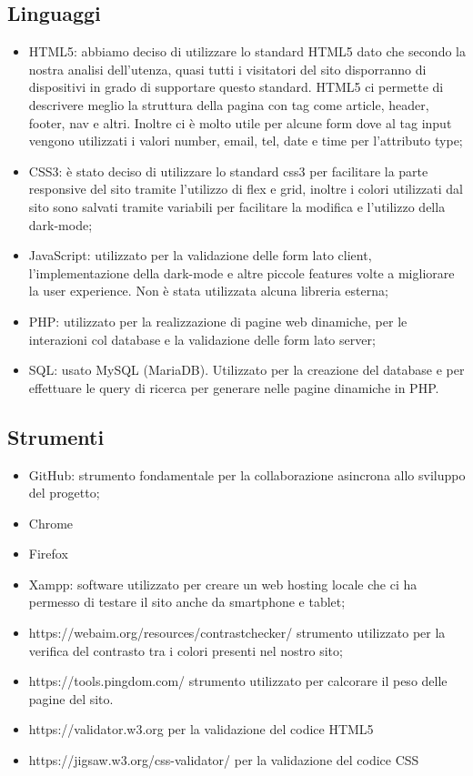 \documentclass[a4paper]{article}
\begin{document}
	\subsection{Linguaggi}
	\begin{itemize}
		\item HTML5: abbiamo deciso di utilizzare lo standard HTML5 dato che secondo la nostra analisi dell'utenza, quasi tutti i visitatori del sito disporranno di dispositivi in grado di supportare questo standard. HTML5 ci permette di descrivere meglio la struttura della pagina con tag come article, header, footer, nav e altri. Inoltre ci è molto utile per alcune form dove al tag input vengono utilizzati i valori number, email, tel, date e time per l'attributo type;
		\item CSS3: è stato deciso di utilizzare lo standard css3 per facilitare la parte responsive del sito tramite l'utilizzo di flex e grid, inoltre i colori utilizzati dal sito sono salvati tramite variabili per facilitare la modifica e l'utilizzo della dark-mode;
		\item JavaScript: utilizzato per la validazione delle form lato client, l'implementazione della dark-mode e altre piccole features volte a migliorare la user experience. Non è stata utilizzata alcuna libreria esterna;
		\item PHP: utilizzato per la realizzazione di pagine web dinamiche, per le interazioni col database e la validazione delle form lato server;
		\item SQL: usato MySQL (MariaDB). Utilizzato per la creazione del database e per effettuare le query di ricerca per generare nelle pagine dinamiche in PHP.
	\end{itemize}

	\subsection{Strumenti}
	\begin{itemize}
		\item GitHub: strumento fondamentale per la collaborazione asincrona allo sviluppo del progetto;
		\item Chrome
		\item Firefox
		\item Xampp: software utilizzato per creare un web hosting locale che ci ha permesso di testare il sito anche da smartphone e tablet;
		\item https://webaim.org/resources/contrastchecker/ strumento utilizzato per la verifica del contrasto tra i colori presenti nel nostro sito;
		\item https://tools.pingdom.com/ strumento utilizzato per calcorare il peso delle pagine del sito.
		\item https://validator.w3.org per la validazione del codice HTML5
		\item https://jigsaw.w3.org/css-validator/ per la validazione del codice CSS
	\end{itemize}
\end{document}
